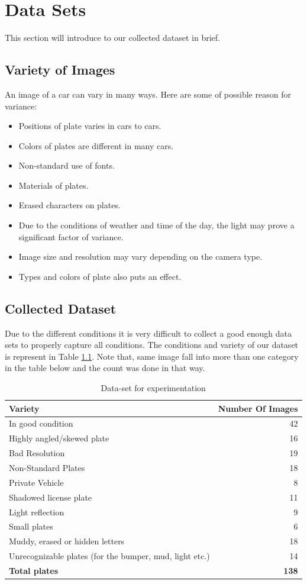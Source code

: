 \documentclass{standalone}
\begin{document}
\chapter{Data Sets}
This section will introduce to our collected dataset in brief. 

\section{Variety of Images}
An image of a car can vary in many ways. Here are some of possible reason for variance:
\begin{itemize}
    \item Positions of plate varies in cars to cars.
    \item Colors of plates are different in many cars.
    \item Non-standard use of fonts.
    \item Materials of plates.
    \item Erased characters on plates.
    \item Due to the conditions of weather and time of the day, the light may prove a significant factor of variance.
    \item Image size and resolution may vary depending on the camera type.
    \item Types and colors of plate also puts an effect.
\end{itemize}

\section{Collected Dataset}
Due to the different conditions it is very difficult to collect a good enough data sets to properly capture all conditions. The conditions and variety of our dataset is represent in Table \ref{table:Variety}. Note that, same image fall into more than one category in the table below and the count was done in that way. 

\begin{table}[hb]
    \centering
    \caption{Data-set for experimentation}
    \label{table:Variety}
    \begin{tabular}{|l|r|}
    \hline
    {\bf Variety}  &  {\bf Number Of Images} \\ 
    \hline 
    In good condition &  42 \\ 
    Highly angled/skewed plate & 16 \\
    Bad Resolution & 19 \\ 
    Non-Standard Plates &  18\\    
    Private Vehicle & 8 \\
    Shadowed license plate & 11 \\    
    Light reflection & 9 \\
    Small plates & 6\\
    Muddy, erased or hidden letters & 18 \\
    Unrecognizable plates (for the bumper, mud, light etc.) & 14  \\
    \hline
    {\bf Total plates} & {\bf 138} \\
    \hline
    \end{tabular}
\end{table}
\end{document}
